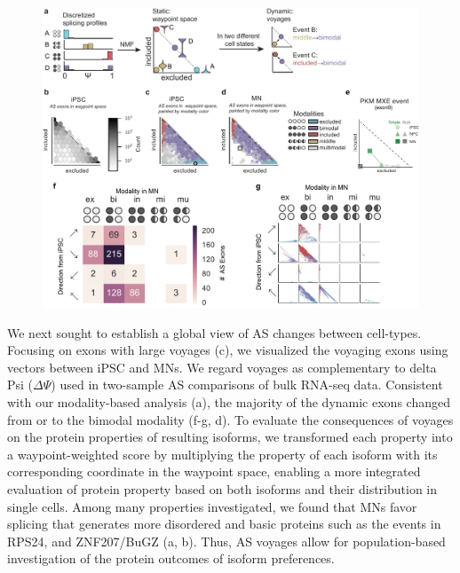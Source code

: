 \clearpage
\begin{figure}[h]
\ContinuedFloat
\captionsetup{labelformat=empty}
\centering
\includegraphics[width=5.8in]{figures/bonvoyage_overview.pdf}
\end{figure}
\clearpage

We next sought to establish a global view of AS changes between cell-types. Focusing on exons with large voyages (c), we visualized the voyaging exons using vectors between iPSC and MNs. We regard voyages as complementary to delta Psi ($\Delta\Psi$) used in two-sample AS comparisons of bulk RNA-seq data. Consistent with our modality-based analysis (a), the majority of the dynamic exons changed from or to the bimodal modality (f-g, d). To evaluate the consequences of voyages on the protein properties of resulting isoforms, we transformed each property into a waypoint-weighted score by multiplying the property of each isoform with its corresponding coordinate in the waypoint space, enabling a more integrated evaluation of protein property based on both isoforms and their distribution in single cells. Among many properties investigated, we found that MNs favor splicing that generates more disordered and basic proteins such as the events in RPS24, and ZNF207/BuGZ (a, b). Thus, AS voyages allow for population-based investigation of the protein outcomes of isoform preferences.



